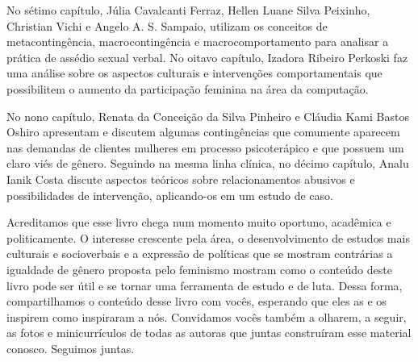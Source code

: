 No sétimo capítulo, Júlia Cavalcanti Ferraz, Hellen Luane Silva Peixinho, Christian Vichi e Angelo A. S. Sampaio, utilizam os conceitos de metacontingência, macrocontingência e macrocomportamento para analisar a prática de assédio sexual verbal. No oitavo capítulo, Izadora Ribeiro Perkoski faz uma análise sobre os aspectos culturais e intervenções comportamentais que possibilitem o aumento da participação feminina na área da computação. 

No nono capítulo, Renata da Conceição da Silva Pinheiro e Cláudia Kami Bastos Oshiro apresentam e discutem algumas contingências que comumente aparecem nas demandas de clientes mulheres em processo psicoterápico e que possuem um claro viés de gênero. Seguindo na mesma linha clínica, no décimo capítulo, Analu Ianik Costa discute aspectos teóricos sobre relacionamentos abusivos e possibilidades de intervenção, aplicando-os em um estudo de caso.

Acreditamos que esse livro chega num momento muito oportuno, acadêmica e politicamente. O interesse crescente pela área, o desenvolvimento de estudos mais culturais e socioverbais e a expressão de políticas que se mostram contrárias a igualdade de gênero proposta pelo feminismo mostram como o conteúdo deste livro pode ser útil e se tornar uma ferramenta de estudo e de luta. Dessa forma, compartilhamos o conteúdo desse livro com vocês, esperando que eles as e os inspirem como inspiraram a nós. Convidamos vocês também a olharem, a seguir, as fotos e minicurrículos de todas as autoras que juntas construíram esse material conosco. Seguimos juntas.